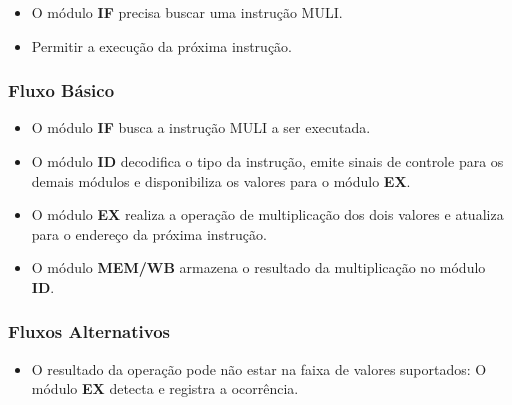 \preconditions 
\begin{itemize}
	\item O módulo \textbf{IF} precisa buscar uma instrução MULI.
\end{itemize}

\postconditions
\begin{itemize}
	\item Permitir a execução da próxima instrução.
\end{itemize}

\subsubsection*{Fluxo Básico}
\begin{itemize}
	\item O módulo \textbf{IF} busca a instrução MULI a ser executada.
	\item O módulo \textbf{ID} decodifica o tipo da instrução, emite sinais de controle para os demais módulos e disponibiliza os valores para o módulo \textbf{EX}.
	\item O módulo \textbf{EX} realiza a operação de multiplicação dos dois valores e atualiza para o endereço da próxima instrução.
	\item O módulo \textbf{MEM/WB} armazena o resultado da multiplicação no módulo \textbf{ID}.
\end{itemize}

\subsubsection*{Fluxos Alternativos}
\begin{itemize}
	\item O resultado da operação pode não estar na faixa de valores suportados:
	\subitem O módulo \textbf{EX} detecta e registra a ocorrência.
\end{itemize}